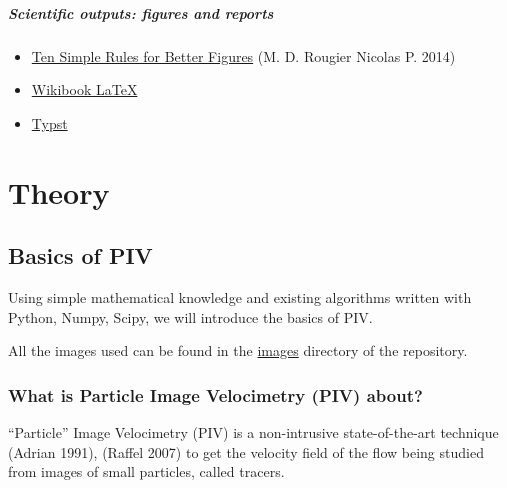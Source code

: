 \documentclass[
  english,
  letterpaper,
  numbers=noendperiod,
  DIV=13]{scrreprt}
\providecommand{\tightlist}{%
  \setlength{\itemsep}{0pt}\setlength{\parskip}{0pt}}
\begin{document}
\subsubsection*{Scientific outputs: figures and
reports}\label{scientific-outputs-figures-and-reports}

\begin{itemize}
\tightlist
\item
  \href{https://journals.plos.org/ploscompbiol/article/file?id=10.1371/journal.pcbi.1003833&type=printable}{Ten
  Simple Rules for Better Figures} (M. D. Rougier Nicolas P. 2014)
\item
  \href{https://fr.wikibooks.org/wiki/LaTeX}{Wikibook LaTeX}
\item
  \href{https://typst.app/}{Typst}
\end{itemize}

\part{Theory}

\chapter{Basics of PIV}\label{basics-of-piv}

Using simple mathematical knowledge and existing algorithms written with
Python, Numpy, Scipy, we will introduce the basics of PIV.

All the images used can be found in the
\href{https://github.com/jfkrawczynski/um5mee12_jfk/tree/main/images}{images}
directory of the repository.

\section{What is Particle Image Velocimetry (PIV)
about?}\label{what-is-particle-image-velocimetry-piv-about}

``Particle'' Image Velocimetry (PIV) is a non-intrusive state-of-the-art
technique (Adrian 1991), (Raffel 2007) to get the velocity field of the
flow being studied from images of small particles, called tracers.
\end{document}
